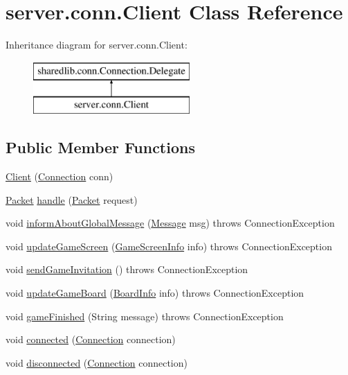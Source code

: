 \hypertarget{classserver_1_1conn_1_1_client}{}\section{server.\+conn.\+Client Class Reference}
\label{classserver_1_1conn_1_1_client}
Inheritance diagram for server.\+conn.\+Client\+:\begin{figure}[H]
\begin{center}
\leavevmode
\includegraphics[height=2.000000cm]{classserver_1_1conn_1_1_client}
\end{center}
\end{figure}
\subsection*{Public Member Functions}
\begin{DoxyCompactItemize}
\item 
\hyperlink{classserver_1_1conn_1_1_client_a5097d176d58d7de8d559d175065ceabf}{Client} (\hyperlink{classsharedlib_1_1conn_1_1_connection}{Connection} conn)
\item 
\hyperlink{classsharedlib_1_1conn_1_1_packet}{Packet} \hyperlink{classserver_1_1conn_1_1_client_a0ddbd06c67e01c0064b5640d5e82c810}{handle} (\hyperlink{classsharedlib_1_1conn_1_1_packet}{Packet} request)
\item 
void \hyperlink{classserver_1_1conn_1_1_client_a7335f0aef6a3b7af5a9194a2bfa69632}{inform\+About\+Global\+Message} (\hyperlink{classsharedlib_1_1tuples_1_1_message}{Message} msg)  throws Connection\+Exception 
\item 
void \hyperlink{classserver_1_1conn_1_1_client_a08ac64f27ada096677c9635d530ed39d}{update\+Game\+Screen} (\hyperlink{classsharedlib_1_1tuples_1_1_game_screen_info}{Game\+Screen\+Info} info)  throws Connection\+Exception 
\item 
void \hyperlink{classserver_1_1conn_1_1_client_aec42adfdb88bb9420e3e64a9438d5b2f}{send\+Game\+Invitation} ()  throws Connection\+Exception 
\item 
void \hyperlink{classserver_1_1conn_1_1_client_a3f453d2e735012e76fae03f9e2b16042}{update\+Game\+Board} (\hyperlink{classsharedlib_1_1tuples_1_1_board_info}{Board\+Info} info)  throws Connection\+Exception 
\item 
void \hyperlink{classserver_1_1conn_1_1_client_a6310d31662f51012c9e6e0aa28d43528}{game\+Finished} (String message)  throws Connection\+Exception 
\item 
void \hyperlink{classserver_1_1conn_1_1_client_a9c86594158e4eb8e09159567dd94f6ce}{connected} (\hyperlink{classsharedlib_1_1conn_1_1_connection}{Connection} connection)
\item 
void \hyperlink{classserver_1_1conn_1_1_client_aa31a10ee47f357ef36983e456c5e9f8e}{disconnected} (\hyperlink{classsharedlib_1_1conn_1_1_connection}{Connection} connection)
\end{DoxyCompactItemize}


